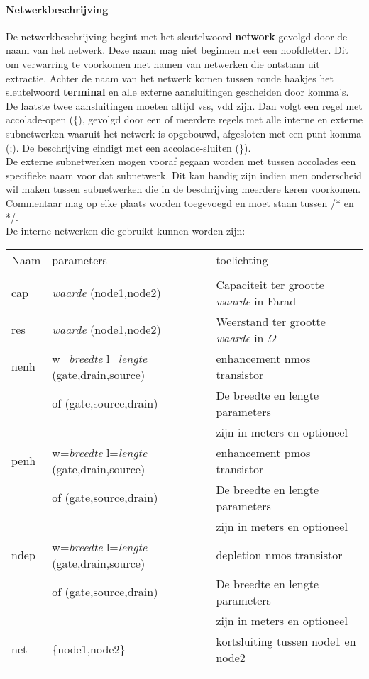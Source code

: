 \paragraph{Netwerkbeschrijving} De netwerkbeschrijving begint met het 
sleutelwoord {\bf network} gevolgd door de naam van het netwerk. Deze naam
mag niet beginnen met een hoofdletter. Dit om verwarring te voorkomen
met namen van netwerken die ontstaan uit extractie. 
Achter de naam van het netwerk
komen tussen ronde haakjes het sleutelwoord {\bf terminal} en alle externe 
aansluitingen gescheiden door komma's. 
De laatste twee aansluitingen moeten altijd vss, vdd zijn.
Dan volgt een regel met accolade-open (\{), gevolgd door een of meerdere 
regels met alle interne en externe subnetwerken waaruit het netwerk 
is opgebouwd,
afgesloten met een punt-komma (;). De beschrijving eindigt met een 
accolade-sluiten (\}).\\
De externe subnetwerken mogen vooraf gegaan worden met tussen accolades een
specifieke naam voor dat subnetwerk. Dit kan handig zijn indien men onderscheid
wil maken tussen subnetwerken die in de beschrijving meerdere keren voorkomen.
Commentaar mag op elke plaats worden toegevoegd en moet staan tussen /* en */.\\
De interne netwerken die gebruikt kunnen worden zijn:

\begin{tabular}{lll}
Naam & parameters & toelichting\\
\\
cap & {\it waarde} (node1,node2) & Capaciteit ter grootte {\it waarde} in Farad\\ \index{cap}
res & {\it waarde} (node1,node2) & Weerstand ter grootte {\it waarde} in $\Omega$\\ \index{res}
nenh & w={\it breedte} l={\it lengte} (gate,drain,source) & enhancement nmos transistor\\ \index{nenh}
&                                of   (gate,source,drain) & De breedte en lengte parameters\\
&& zijn in meters en optioneel\\
penh & w={\it breedte} l={\it lengte} (gate,drain,source) & enhancement pmos transistor\\ \index{penh}
&                                of   (gate,source,drain) & De breedte en lengte parameters\\
&& zijn in meters en optioneel\\
ndep & w={\it breedte} l={\it lengte} (gate,drain,source) & depletion nmos transistor\\
&                                of   (gate,source,drain) & De breedte en lengte parameters\\
&& zijn in meters en optioneel\\
net & \{node1,node2\} & kortsluiting tussen node1 en node2\\\index{net}
\\
\end{tabular} 

